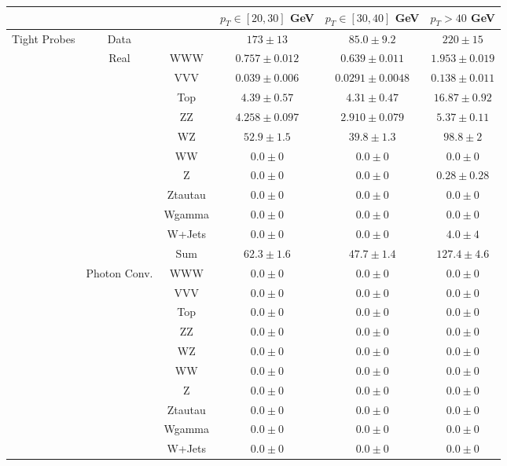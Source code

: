 \small
\begin{tabular}{|c|cc||c|c|c|}
\hline
\multicolumn{3}{|c||}{} & $p_{T}\in[20,30]$ GeV & $p_{T}\in[30,40]$ GeV & $p_{T} > 40$ GeV\\ 
\hline
\hline
\multirow{23}{*}{Tight Probes} & Data  & &  $173 \pm 13$ &  $85.0 \pm 9.2$ &  $220 \pm 15$\\ 
\cline{2-6}

&\multirow{11}{*}{Real} &WWW &  $0.757 \pm 0.012$ &  $0.639 \pm 0.011$ &  $1.953 \pm 0.019$\\ 
&& VVV &  $0.039 \pm 0.006$ &  $0.0291 \pm 0.0048$ &  $0.138 \pm 0.011$\\ 
&& Top &  $4.39 \pm 0.57$ &  $4.31 \pm 0.47$ &  $16.87 \pm 0.92$\\ 
&& ZZ &  $4.258 \pm 0.097$ &  $2.910 \pm 0.079$ &  $5.37 \pm 0.11$\\ 
&& WZ &  $52.9 \pm 1.5$ &  $39.8 \pm 1.3$ &  $98.8 \pm 2$\\ 
&& WW &  $0.0 \pm 0$ &  $0.0 \pm 0$ &  $0.0 \pm 0$\\ 
&& Z &  $0.0 \pm 0$ &  $0.0 \pm 0$ &  $0.28 \pm 0.28$\\ 
&& Ztautau &  $0.0 \pm 0$ &  $0.0 \pm 0$ &  $0.0 \pm 0$\\ 
&& Wgamma &  $0.0 \pm 0$ &  $0.0 \pm 0$ &  $0.0 \pm 0$\\ 
&& W+Jets &  $0.0 \pm 0$ &  $0.0 \pm 0$ &  $4.0 \pm 4$\\ 
\cline{3-6}
&& Sum &  $62.3 \pm 1.6$ &  $47.7 \pm 1.4$ &  $127.4 \pm 4.6$\\ 
\cline{2-6}
\cline{2-6}
&\multirow{11}{*}{Photon Conv.} & WWW &  $0.0 \pm 0$ &  $0.0 \pm 0$ &  $0.0 \pm 0$\\ 
&& VVV &  $0.0 \pm 0$ &  $0.0 \pm 0$ &  $0.0 \pm 0$\\ 
&& Top &  $0.0 \pm 0$ &  $0.0 \pm 0$ &  $0.0 \pm 0$\\ 
&& ZZ &  $0.0 \pm 0$ &  $0.0 \pm 0$ &  $0.0 \pm 0$\\ 
&& WZ &  $0.0 \pm 0$ &  $0.0 \pm 0$ &  $0.0 \pm 0$\\ 
&& WW &  $0.0 \pm 0$ &  $0.0 \pm 0$ &  $0.0 \pm 0$\\ 
&& Z &  $0.0 \pm 0$ &  $0.0 \pm 0$ &  $0.0 \pm 0$\\ 
&& Ztautau &  $0.0 \pm 0$ &  $0.0 \pm 0$ &  $0.0 \pm 0$\\ 
&& Wgamma &  $0.0 \pm 0$ &  $0.0 \pm 0$ &  $0.0 \pm 0$\\ 
&& W+Jets &  $0.0 \pm 0$ &  $0.0 \pm 0$ &  $0.0 \pm 0$\\ 

\end{tabular}

